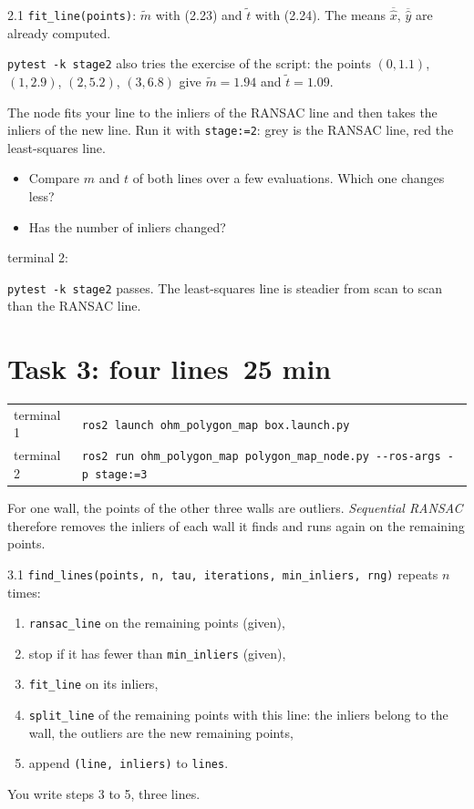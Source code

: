\documentclass[11pt,a4paper,parskip=half]{scrartcl}
\makeatletter
\newcommand{\thema}[1]{\texttt{#1}}
\newcommand{\minutes}[1]{\hfill{\normalsize\mdseries\color{ohmgrey}\faClock[regular]~#1 min}}
\newcommand{\running}[2]{\begin{tcolorbox}[base, colback=black!3, borderline west={2.5pt}{0pt}{ohmgrey},
        title={\faTerminal~Running}, coltitle=ohmgrey, colbacktitle=black!3, fonttitle=\small\bfseries,
        toptitle=2pt, bottomtitle=0pt, fontupper=\small]
  \begin{tabularx}{\linewidth}{@{}>{\color{ohmgrey}}l >{\raggedright\arraybackslash}X@{}}
    terminal 1 & \texttt{ros2 launch ohm\_polygon\_map box.launch.py#1} \\
    terminal 2 & \texttt{ros2 run ohm\_polygon\_map polygon\_map\_node.py -\kern0pt-ros-args #2}
  \end{tabularx}
\end{tcolorbox}}
\newcommand{\expected}[2][]{\begin{seebox}
  \begin{minipage}[c]{0.36\linewidth}\resizebox{\linewidth}{!}{}\end{minipage}%
  \hfill
  \begin{minipage}[c]{0.615\linewidth}
    {\footnotesize\color{ohmgrey}#1terminal 2:}
    
  \end{minipage}
\end{seebox}}
\makeatother
\begin{document}
\begin{todo}{2.1}
\thema{fit\_line(points)}: \(\tilde m\) with (2.23) and \(\tilde t\) with (2.24). The means
\(\overline{\hat x}\), \(\overline{\hat y}\) are already computed.
\end{todo}

\thema{pytest -k stage2} also tries the exercise of the script: the points \((0, 1.1)\), \((1, 2.9)\),
\((2, 5.2)\), \((3, 6.8)\) give \(\tilde m = 1.94\) and \(\tilde t = 1.09\).

The node fits your line to the inliers of the RANSAC line and then takes the inliers of the new line.
Run it with \thema{stage:=2}: grey is the RANSAC line, red the least-squares line.
\begin{itemize}
  \item Compare \(m\) and \(t\) of both lines over a few evaluations. Which one changes less?
  \item Has the number of inliers changed?
\end{itemize}

\expected[]{stage2}

\begin{checkpoint}
\thema{pytest -k stage2} passes. The least-squares line is steadier from scan to scan than the RANSAC line.
\end{checkpoint}

\newpage
\section{Task 3: four lines\minutes{25}}
\label{sec:task3}
\running{}{-p stage:=3}

For one wall, the points of the other three walls are outliers. \emph{Sequential RANSAC} therefore
removes the inliers of each wall it finds and runs again on the remaining points.

\begin{todo}{3.1}
\thema{find\_lines(points, n, tau, iterations, min\_inliers, rng)} repeats \(n\) times:
\begin{enumerate}
  \item \thema{ransac\_line} on the remaining points (given),
  \item stop if it has fewer than \thema{min\_inliers} (given),
  \item \thema{fit\_line} on its inliers,
  \item \thema{split\_line} of the remaining points with this line: the inliers belong to the wall,
        the outliers are the new remaining points,
  \item append \thema{(line, inliers)} to \thema{lines}.
\end{enumerate}
You write steps 3 to 5, three lines.
\end{todo}
\end{document}
